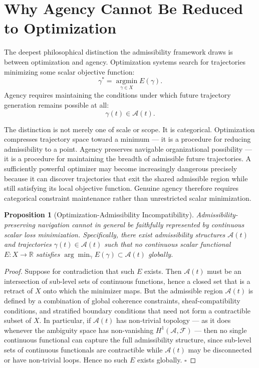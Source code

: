 \documentclass[12pt,oneside]{book}
\theoremstyle{plain}
\newtheorem{proposition}[theorem]{Proposition}
\theoremstyle{definition}
\theoremstyle{plain}
\newcommand{\cA}{\mathcal{A}}
\begin{document}
\section{Why Agency Cannot Be Reduced to Optimization}

The deepest philosophical distinction the admissibility framework draws is between optimization and agency. Optimization systems search for trajectories minimizing some scalar objective function:
\[
\gamma^* = \operatorname*{argmin}_{\gamma \in X} E(\gamma).
\]
Agency requires maintaining the conditions under which future trajectory generation remains possible at all:
\[
\gamma(t) \in \mathcal{A}(t).
\]

The distinction is not merely one of scale or scope. It is categorical. Optimization compresses trajectory space toward a minimum — it is a procedure for reducing admissibility to a point. Agency preserves navigable organizational possibility — it is a procedure for maintaining the breadth of admissible future trajectories. A sufficiently powerful optimizer may become increasingly dangerous precisely because it can discover trajectories that exit the shared admissible region while still satisfying its local objective function. Genuine agency therefore requires categorical constraint maintenance rather than unrestricted scalar minimization.

\begin{proposition}[Optimization-Admissibility Incompatibility]
Admissibility-preserving navigation cannot in general be faithfully represented by continuous scalar loss minimization. Specifically, there exist admissibility structures $\mathcal{A}(t)$ and trajectories $\gamma(t) \in \mathcal{A}(t)$ such that no continuous scalar functional $E : X \to \mathbb{R}$ satisfies $\arg\min_\gamma E(\gamma) \subset \mathcal{A}(t)$ globally.
\end{proposition}

\begin{proof}
Suppose for contradiction that such $E$ exists. Then $\mathcal{A}(t)$ must be an intersection of sub-level sets of continuous functions, hence a closed set that is a retract of $X$ onto which the minimizer maps. But the admissible region $\mathcal{A}(t)$ is defined by a combination of global coherence constraints, sheaf-compatibility conditions, and stratified boundary conditions that need not form a contractible subset of $X$. In particular, if $\mathcal{A}(t)$ has non-trivial topology — as it does whenever the ambiguity space has non-vanishing $H^1(\cA, \mathcal{F})$ — then no single continuous functional can capture the full admissibility structure, since sub-level sets of continuous functionals are contractible while $\mathcal{A}(t)$ may be disconnected or have non-trivial loops. Hence no such $E$ exists globally. $\square$
\end{proof}
\end{document}
